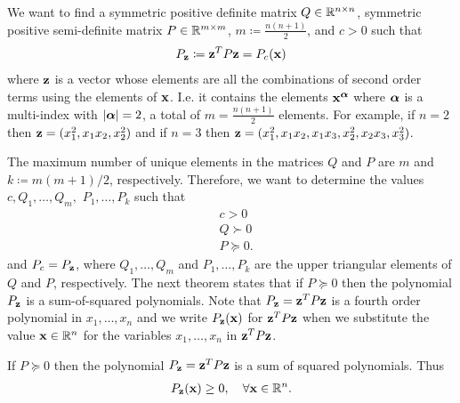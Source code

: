 \documentclass[a4paper,12pt,twoside,BCOR=10mm]{scrbook}
\begin{document}
We want to find a symmetric positive definite matrix $Q\in \mathbb{R}^{n\times n}$, symmetric positive semi-definite matrix $P \in \mathbb{R}^{m \times m}$, $m \coloneqq \frac{n(n + 1)}{2}$, and $c > 0$ such that
\begin{align}\label{P_Z definition}
    P_{\mathbf{z}} \coloneqq \mathbf{z}^T P \mathbf{z} = P_c(\mathbf{x})
\end{align}
where $\mathbf{z}$ is a vector whose elements are all the combinations of second order terms using the elements of $\mathbf{x}$. I.e. it contains the elements $\mathbf{x}^{\bm{\alpha}}$ where $\bm{\alpha}$ is a multi-index with $|\bm{\alpha}| = 2$, a total of $m = \frac{n(n + 1)}{2}$ elements. For example, if $n = 2$ then $\mathbf{z} = (x_1^2, x_1x_2, x_2^2)$ and if $n = 3$ then $\mathbf{z} = (x_1^2, x_1x_2, x_1x_3, x_2^2, x_2x_3, x_3^2)$.

The maximum number of unique elements in the matrices $Q$ and $P$ are $m$ and $k \coloneqq m(m + 1) / 2$, respectively.
Therefore, we want to determine the values $c, Q_1, \ldots, Q_m,$ $P_1, \ldots, P_k$ such that
\begin{align*}
    &c > 0\\
    &Q
    \succ 0\\
    &P
    \succeq 0.
\end{align*}
and $P_c = P_{\mathbf{z}}$, where $Q_1, \ldots, Q_m$ and $P_1, \ldots, P_k$ are the upper triangular elements of $Q$ and $P$, respectively. The next theorem states that if $P \succeq 0$ then the polynomial $P_{\mathbf{z}}$ is a sum-of-squared polynomials. Note that $P_{\mathbf{z}} = \mathbf{z}^T P \mathbf{z}$ is a fourth order polynomial in $x_1, \ldots, x_n$ and we write $P_{\mathbf{z}}(\mathbf{x})$ for $\mathbf{z}^T P \mathbf{z}$ when we substitute the value $\mathbf{x} \in \mathbb{R}^{n}$ for the variables $x_1, \ldots, x_n$ in $\mathbf{z}^T P \mathbf{z}$.
\begin{theorem}
If $P \succeq 0$ then the polynomial $P_{\mathbf{z}} = \mathbf{z}^T P \mathbf{z}$ is a sum of squared polynomials. Thus \begin{align*}
    P_{\mathbf{z}}(\mathbf{x}) \geq 0, \quad \forall \mathbf{x} \in \mathbb{R}^{n}.
\end{align*}
\end{theorem}
\end{document}

